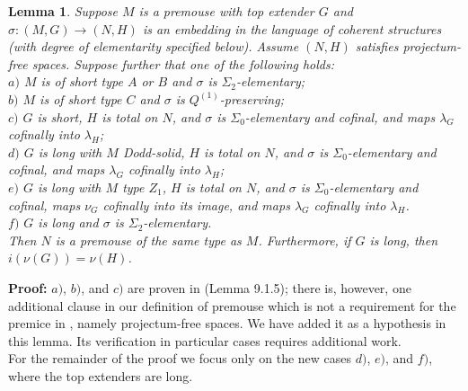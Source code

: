\documentclass[12pt]{article}
\newtheorem{lem}[thm]{Lemma}
\begin{document}
\begin{lem} \label{upward mouse-pres}
Suppose $M$ is a premouse with top extender $G$ and $\sigma: (M, G) \longrightarrow (N, H)$ is an embedding in the language of coherent structures (with degree of elementarity specified below).  Assume $(N, H)$ satisfies projectum-free spaces.  Suppose further that one of the following holds:\\

\indent $a)$ $M$ is of short type $A$ or $B$ and $\sigma$ is $\Sigma_2$-elementary;\\

\indent $b)$ $M$ is  of short type $C$ and $\sigma$ is $Q^{(1)}$-preserving;\\

\indent $c)$ $G$ is short, $H$ is total on $N$, and $\sigma$ is $\Sigma_0$-elementary and cofinal, and maps $\lambda_G$ cofinally into $\lambda_H$;\\

\indent $d)$ $G$ is long with $M$ Dodd-solid, $H$ is total on $N$, and $\sigma$ is $\Sigma_0$-elementary and cofinal, and maps $\lambda_G$ cofinally into $\lambda_H$;\\

\indent $e)$ $G$ is long with $M$ type $Z_1$, $H$ is total on $N$, and $\sigma$ is $\Sigma_0$-elementary and cofinal, maps $\nu_G$ cofinally into its image, and maps $\lambda_G$ cofinally into $\lambda_H$.\\

\indent $f)$ $G$ is long and $\sigma$ is $\Sigma_2$-elementary.\\

Then $N$ is a premouse of the same type as $M$.  Furthermore, if $G$ is long, then $i (\nu (G)) = \nu (H)$.
\end{lem}

\textbf{Proof:}  $a)$, $b)$, and $c)$ are proven in \cite{zeman book} (Lemma 9.1.5); there is, however, one additional clause in our definition of premouse which is not a requirement for the premice in \cite{zeman book}, namely projectum-free spaces.  We have added it as a hypothesis in this lemma.  Its verification in particular cases requires additional work.\\


For the remainder of the proof we focus only on the new cases $d)$, $e)$, and $f)$, where the top extenders are long.\\
\end{document}
